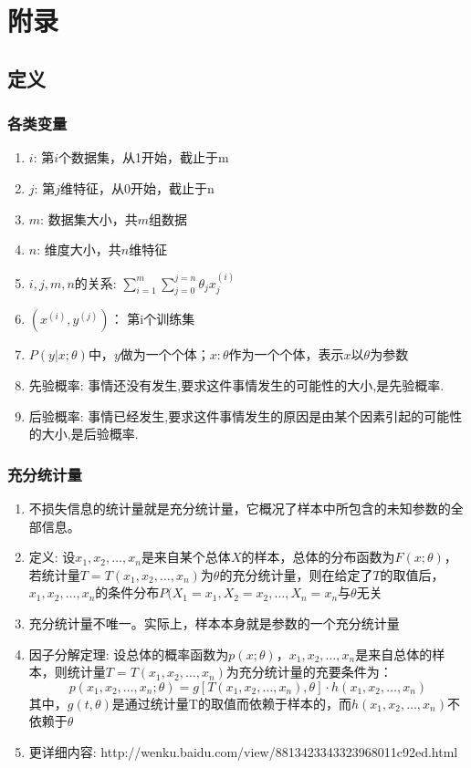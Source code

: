 \section{附录}
\subsection{定义}
\subsubsection{各类变量}
\begin{enumerate}
	\item $i$: 第$i$个数据集，从1开始，截止于m
	\item $j$: 第$j$维特征，从0开始，截止于n
	\item $m$: 数据集大小，共$m$组数据
	\item $n$: 维度大小，共$n$维特征
	\item $i, j, m, n$的关系: $\sum_{i=1}^{m}\sum_{j=0}^{j=n}{\theta_{j}x_j^{(i)}}$
	\item $(x^{(i)}, y^{(j)})$： 第i个训练集
	\item $P(y|x;\theta)$中，$y$做为一个个体；$x:\theta$作为一个个体，表示$x$以$\theta$为参数
	\item 先验概率: 事情还没有发生,要求这件事情发生的可能性的大小,是先验概率. 
	\item 后验概率: 事情已经发生,要求这件事情发生的原因是由某个因素引起的可能性的大小,是后验概率.
\end{enumerate}

\subsubsection{充分统计量}
\begin{enumerate}
	\item 不损失信息的统计量就是充分统计量，它概况了样本中所包含的未知参数的全部信息。
	\item 定义: 设$x_1, x_2, \dots, x_n$是来自某个总体$X$的样本，总体的分布函数为$F(x;\theta)$，若统计量$T=T(x_1, x_2, \dots, x_n)$为$\theta$的充分统计量，则在给定了$T$的取值后，$x_1, x_2, \dots, x_n$的条件分布$P(X_1=x_1, X_2=x_2, \dots, X_n=x_n$与$\theta$无关
	\item 充分统计量不唯一。实际上，样本本身就是参数的一个充分统计量
	\item 因子分解定理{\color{red}{（没看懂）}}: 设总体的概率函数为$p(x;\theta)$，$x_1, x_2, \dots, x_n$是来自总体的样本，则统计量$T=T(x_1, x_2, \dots, x_n)$为充分统计量的充要条件为：
	\begin{equation}
		p(x_1, x_2, \dots, x_n;\theta) = g\left[T(x_1, x_2, \dots, x_n),\theta\right]\cdot h(x_1, x_2, \dots, x_n)
	\end{equation}
	其中，$g(t,\theta)$是通过统计量T的取值而依赖于样本的，而$h(x_1, x_2, \dots, x_n)$不依赖于$\theta$
	\item 更详细内容: http://wenku.baidu.com/view/8813423343323968011c92ed.html
\end{enumerate}

